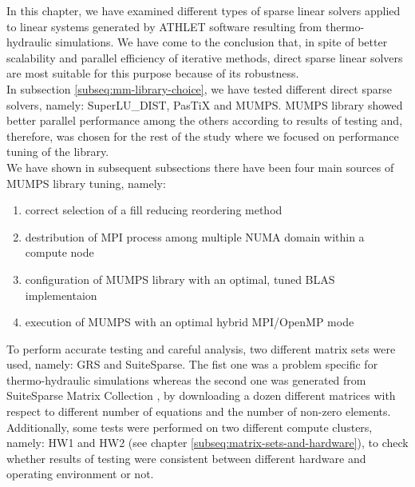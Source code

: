 \label{subseq:mm-conclusion}

In this chapter, we have examined different types of sparse linear solvers applied to linear systems generated by ATHLET software resulting from thermo-hydraulic simulations. We have come to the conclusion that, in spite of better scalability and parallel efficiency of iterative methods, direct sparse linear solvers are most suitable for this purpose because of its robustness.\\


In subsection \ref{subseq:mm-library-choice}, we have tested different direct sparse solvers, namely: SuperLU\_DIST, PasTiX and MUMPS. MUMPS library showed better parallel performance among the others according to results of testing and, therefore, was chosen for the rest of the study where we focused on performance tuning of the library.\\


We have shown in subsequent subsections there have been four main sources of MUMPS library tuning, namely:

\begin{enumerate}
	\item correct selection of a fill reducing reordering method \label{conclusion:mm-1}
	\item destribution of MPI process among multiple NUMA domain within a compute node \label{conclusion:mm-2}
	\item configuration of MUMPS library with an optimal, tuned BLAS implementaion \label{conclusion:mm-3}
	\item execution of MUMPS with an optimal hybrid MPI/OpenMP mode \label{conclusion:mm-4}
\end{enumerate}


To perform accurate testing and careful analysis, two different matrix sets were used, namely: GRS and SuiteSparse. The fist one was a problem specific for thermo-hydraulic simulations whereas the second one was generated from SuiteSparse Matrix Collection \cite{sparse-matrix-collection:1}, \cite{sparse-matrix-collection:2} by downloading a dozen different matrices with respect to different number of equations and the number of non-zero elements. Additionally, some tests were performed on two different compute clusters, namely: HW1 and HW2 (see chapter \ref{subseq:matrix-sets-and-hardware}), to check whether results of testing were consistent between different hardware and operating environment or not.\\



